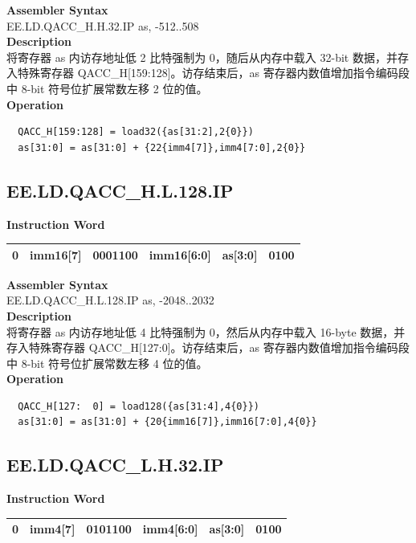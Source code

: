 \textbf{Assembler Syntax} \\
EE.LD.QACC\_H.H.32.IP as, -512..508 \\
\textbf{Description} \\
将寄存器 as 内访存地址低 2 比特强制为 0，随后从内存中载入 32-bit 数据，并存入特殊寄存器 QACC\_H[159:128]。访存结束后，as 寄存器内数值增加指令编码段中 8-bit 符号位扩展常数左移 2 位的值。\\
\textbf{Operation}
\begin{lstlisting}
  QACC_H[159:128] = load32({as[31:2],2{0}})
  as[31:0] = as[31:0] + {22{imm4[7]},imm4[7:0],2{0}}
\end{lstlisting}

\clearpage
\subsection{EE.LD.QACC\_H.L.128.IP}\label{instruction:EELDQACCHL128IP}
\setlength\tabcolsep{6pt}
\textbf{Instruction Word} \\
\begin{tabular}{|c|c|c|c|c|c|}
	\hline
	0 & imm16[7] & 0001100 & imm16[6:0] & as[3:0] & 0100 \\
	\hline
\end{tabular}

\textbf{Assembler Syntax} \\
EE.LD.QACC\_H.L.128.IP as, -2048..2032 \\
\textbf{Description} \\
将寄存器 as 内访存地址低 4 比特强制为 0，然后从内存中载入 16-byte 数据，并存入特殊寄存器 QACC\_H[127:0]。访存结束后，as 寄存器内数值增加指令编码段中 8-bit 符号位扩展常数左移 4 位的值。\\
\textbf{Operation}
\begin{lstlisting}
  QACC_H[127:  0] = load128({as[31:4],4{0}})
  as[31:0] = as[31:0] + {20{imm16[7]},imm16[7:0],4{0}}
\end{lstlisting}

\clearpage
\subsection{EE.LD.QACC\_L.H.32.IP}\label{instruction:EELDQACCLH32IP}
\setlength\tabcolsep{6pt}
\textbf{Instruction Word} \\
\begin{tabular}{|c|c|c|c|c|c|}
	\hline
	0 & imm4[7] & 0101100 & imm4[6:0] & as[3:0] & 0100 \\
	\hline
\end{tabular}

